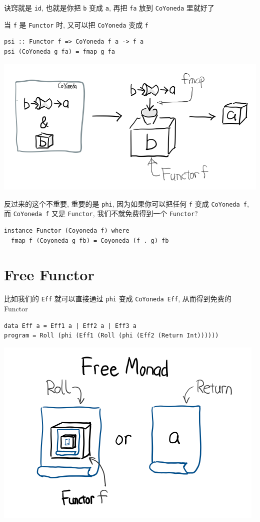 \documentclass[11pt]{tufte-book}
\begin{document}
诀窍就是 \texttt{id}, 也就是你把 \texttt{b} 变成 \texttt{a}, 再把 \texttt{fa} 放到 \texttt{CoYoneda} 里就好了

当 \texttt{f} 是 \texttt{Functor} 时, 又可以把 \texttt{CoYoneda} 变成 \texttt{f}

\begin{verbatim}
psi :: Functor f => CoYoneda f a -> f a
psi (CoYoneda g fa) = fmap g fa
\end{verbatim}

\begin{center}
\includegraphics[width=.9\linewidth]{images/p3-CoYoneda-psi.png}
\end{center}

反过来的这个不重要, 重要的是 \texttt{phi}, 因为如果你可以把任何 \texttt{f} 变成 \texttt{CoYoneda f}, 而 \texttt{CoYoneda f} 又是 \texttt{Functor},
我们不就免费得到一个 \texttt{Functor}?

\begin{verbatim}
instance Functor (Coyoneda f) where
  fmap f (Coyoneda g fb) = Coyoneda (f . g) fb
\end{verbatim}

\section{Free Functor}
\label{sec:org5d9ab27}
比如我们的 \texttt{Eff} 就可以直接通过 \texttt{phi} 变成 \texttt{CoYoneda Eff}, 从而得到免费的 Functor

\begin{verbatim}
data Eff a = Eff1 a | Eff2 a | Eff3 a
program = Roll (phi (Eff1 (Roll (phi (Eff2 (Return Int))))))
\end{verbatim}

\begin{center}
\includegraphics[width=.9\linewidth]{images/p3-Free.png}
\end{center}
\end{document}
